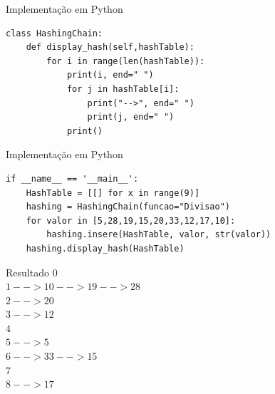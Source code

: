 \documentclass{beamer}
\begin{document}
\begin{frame}[fragile]{Implementação em Python} 
\centering\footnotesize
\begin{lstlisting}[style=PythonStyle]
class HashingChain:
    def display_hash(self,hashTable):
        for i in range(len(hashTable)):
            print(i, end=" ")
            for j in hashTable[i]:
                print("-->", end=" ")
                print(j, end=" ")
            print()
\end{lstlisting}


\end{frame}

\begin{frame}[fragile]{Implementação em Python} 
\footnotesize
\begin{lstlisting}[style=PythonStyle]
if __name__ == '__main__':
    HashTable = [[] for x in range(9)]
    hashing = HashingChain(funcao="Divisao")
    for valor in [5,28,19,15,20,33,12,17,10]:
        hashing.insere(HashTable, valor, str(valor))
    hashing.display_hash(HashTable)
\end{lstlisting}
\begin{block}{Resultado}
$0$\\ 
$1 --> 10 --> 19 --> 28$\\ 
$2 --> 20$\\ 
$3 --> 12$\\ 
$4$\\ 
$5 --> 5$\\ 
$6 --> 33 --> 15$\\ 
$7$\\ 
$8 --> 17$ 
\end{block}
\end{frame}

%
%
%
%
\end{document}
